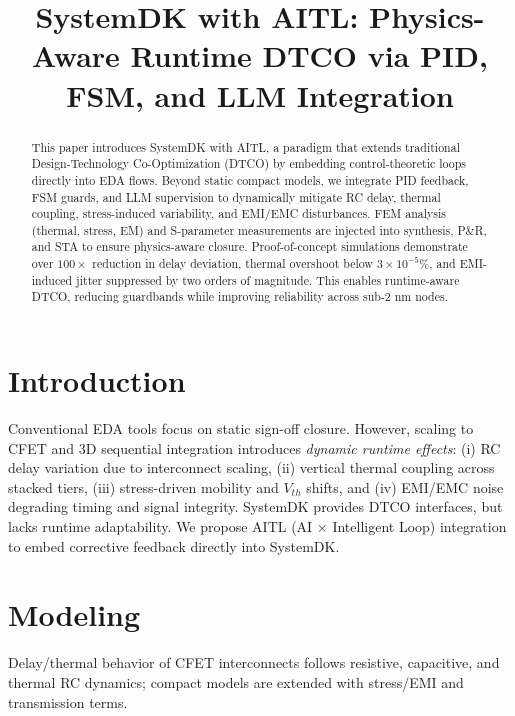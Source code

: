 \documentclass[conference]{IEEEtran}
\begin{document}
\title{SystemDK with AITL: Physics-Aware Runtime DTCO via PID, FSM, and LLM Integration}

\author{
}

\maketitle

\begin{abstract}
This paper introduces SystemDK with AITL, a paradigm that extends traditional Design-Technology Co-Optimization (DTCO) by embedding control-theoretic loops directly into EDA flows. Beyond static compact models, we integrate PID feedback, FSM guards, and LLM supervision to dynamically mitigate RC delay, thermal coupling, stress-induced variability, and EMI/EMC disturbances. FEM analysis (thermal, stress, EM) and S-parameter measurements are injected into synthesis, P\&R, and STA to ensure physics-aware closure. Proof-of-concept simulations demonstrate over $100\times$ reduction in delay deviation, thermal overshoot below $3\times 10^{-5}\%$, and EMI-induced jitter suppressed by two orders of magnitude. This enables runtime-aware DTCO, reducing guardbands while improving reliability across sub-2 nm nodes.
\end{abstract}

\section{Introduction}
Conventional EDA tools focus on static sign-off closure. However, scaling to CFET and 3D sequential integration introduces \emph{dynamic runtime effects}: (i) RC delay variation due to interconnect scaling, (ii) vertical thermal coupling across stacked tiers, (iii) stress-driven mobility and $V_{th}$ shifts, and (iv) EMI/EMC noise degrading timing and signal integrity. SystemDK provides DTCO interfaces, but lacks runtime adaptability. We propose AITL (AI $\times$ Intelligent Loop) integration to embed corrective feedback directly into SystemDK.

\section{Modeling}
Delay/thermal behavior of CFET interconnects follows resistive, capacitive, and thermal RC dynamics; compact models are extended with stress/EMI and transmission terms.
\end{document}
